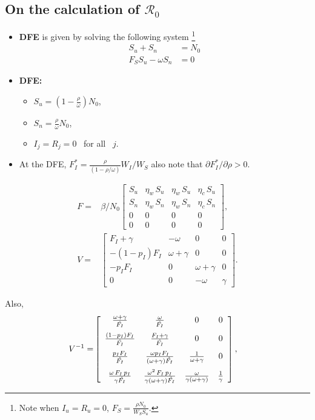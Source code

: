 \documentclass[12pt]{article}
\newcommand{\Rnum}{\mathcal{R}_0}
\theoremstyle{definition} %
\begin{document}
\subsection{On the calculation of $\Rnum$}
\begin{itemize}
\item
{\bf DFE} is given by solving the following system \footnote {Note when $I_u=R_u=0$, $F_S=\frac{\rho N_0}{W_S S_u}$. }
\begin{align*}
S_u+S_n &= N_0 \\
F_S S_u-\omega S_n &= 0
\end{align*}
\item {\bf DFE:}
  \begin{itemize}
    \item[] $S_u = (1-\frac{\rho}{\omega})N_0$,
    \item[] $S_n = \frac{\rho}{\omega} N_0$,
    \item[] $I_j=R_j=0$ \, for all \, $j$.
  \end{itemize}
\item At the DFE, $F_I^* =\frac{\rho }{ (1-\rho/\omega) } W_I/W_S$
also note that $\partial{F_I^*}/\partial{\rho}>0.$
\end{itemize}

\begin{align}
\label{FV}
F =& \beta/N_0 \left[ \begin {array}{cccc}
S_u&\eta_w\,S_u&\eta_w\,S_u&\eta_c\,S_u\\
S_n&\eta_w\,S_n&\eta_w\,S_n&\eta_c\,S_n\\
0&0&0&0\\
0&0&0&0
 \end {array} \right], \\
  V =&
 \left[ \begin {array}{cccc}
F_I+\gamma&-\omega&0&0\\
-(1-p_I)F_I&\omega+\gamma&0&0\\
-p_I F_I&0&\omega+\gamma&0\\
0&0&-\omega&\gamma
\end {array} \right].
\end{align}

Also,
\begin{align}
\label{Vinv}
V^{-1} =&
\left[ \begin {array}{cccc}
\frac {\omega+\gamma}{\hat{F_I}} & \frac {\omega}{\hat{F_I}}&0&0\\
\noalign{\medskip}
\frac{(1-p_I) F_I}{\hat{F_I}}& \frac{F_I+\gamma}{\hat{F_I}}&0&0\\
\noalign{\medskip}
\frac{p_I F_I}{\hat{F_I}}& \frac{\omega p_I F_I}{(\omega+\gamma)\hat{F_I}}& \frac{1}{\omega+\gamma}&0 \\
\noalign{\medskip}
\frac{\omega\,F_I\,p_I}{\gamma \hat{F_I}}&
\frac{\omega^2\,F_I\,p_I}{\gamma(\omega+\gamma) \hat{F_I}}&
\frac{\omega}{\gamma (\omega+\gamma)}&
\frac{1}{\gamma}
\end {array} \right],
\end{align}
\end{document}
